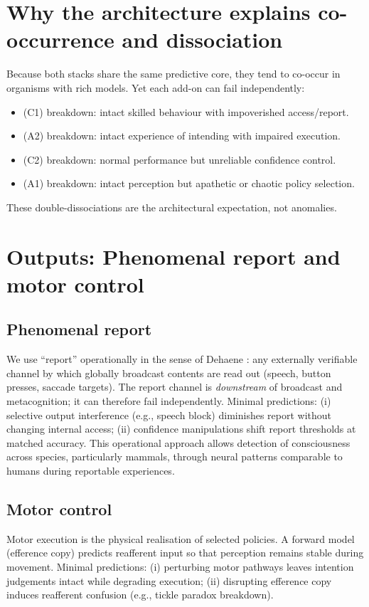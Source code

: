 \documentclass[11pt]{article}
\begin{document}
\section{Why the architecture explains co-occurrence and dissociation}
Because both stacks share the same predictive core, they tend to co-occur in organisms with rich models. 
Yet each add-on can fail independently:
\begin{itemize}
  \item (C1) breakdown: intact skilled behaviour with impoverished access/report.
  \item (A2) breakdown: intact experience of intending with impaired execution.
  \item (C2) breakdown: normal performance but unreliable confidence control.
  \item (A1) breakdown: intact perception but apathetic or chaotic policy selection.
\end{itemize}
These double-dissociations are the architectural expectation, not anomalies.

\section{Outputs: Phenomenal report and motor control}
\subsection*{Phenomenal report}
We use ``report'' operationally in the sense of Dehaene \citep{dehaene2014consciousness}: any externally verifiable channel by which globally broadcast contents are
read out (speech, button presses, saccade targets). The report channel is \emph{downstream} of broadcast and
metacognition; it can therefore fail independently. Minimal predictions: (i) selective output interference
(e.g., speech block) diminishes report without changing internal access; (ii) confidence manipulations shift
report thresholds at matched accuracy. 
This operational approach allows detection of consciousness across species, particularly mammals, through neural patterns comparable to humans during reportable experiences.

\subsection*{Motor control}
Motor execution is the physical realisation of selected policies. A forward model (efference copy) predicts
reafferent input so that perception remains stable during movement. Minimal predictions: (i) perturbing motor
pathways leaves intention judgements intact while degrading execution; (ii) disrupting efference copy induces
reafferent confusion (e.g., tickle paradox breakdown).
\end{document}
